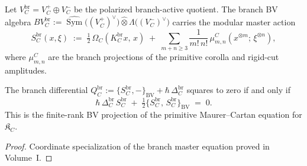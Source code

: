\begin{definition}
\label{def:vol2-branch-bv-action}

Let $V_C^{\mathrm{br}} = V_C^+ \oplus V_C^-$ be the polarized
branch-active quotient. The branch BV algebra
$BV_C^{\mathrm{br}} :=
\widehat{\operatorname{Sym}}\bigl((V_C^+)^\vee\bigr)
\widehat\otimes
\Lambda\bigl((V_C^-)^\vee\bigr)$
carries the modular master action
\begin{equation}
\label{eq:vol2-branch-master-action}
S_C^{\mathrm{br}}(x,\xi)
\;:=\;
\tfrac{1}{2}\,\Omega_C(K_C^{\mathrm{br}} x,\, x)
\;+\;
\sum_{m+n \geq 3}
\frac{1}{m!\,n!}\,
\mu^C_{m,n}(x^{\otimes m};\,\xi^{\otimes n}),
\end{equation}
where $\mu^C_{m,n}$ are the branch projections of the primitive
corolla and rigid-cut amplitudes.
\end{definition}

\begin{proposition}
\label{prop:vol2-branch-qme}

The branch differential
$Q_C^{\mathrm{br}} := \{S_C^{\mathrm{br}}, -\}_{\mathrm{BV}}
+ \hbar\,\Delta_C^{\mathrm{br}}$
squares to zero if and only if
\begin{equation}
\label{eq:vol2-branch-qme}
\hbar\,\Delta_C^{\mathrm{br}}\, S_C^{\mathrm{br}}
\;+\;
\tfrac{1}{2}\{S_C^{\mathrm{br}},\, S_C^{\mathrm{br}}\}_{\mathrm{BV}}
\;=\; 0.
\end{equation}
This is the finite-rank BV projection of the primitive
Maurer--Cartan equation for $\mathfrak{K}_C$.
\end{proposition}

\begin{proof}
Coordinate specialization of the branch master equation proved in
Volume~I.
\end{proof}

